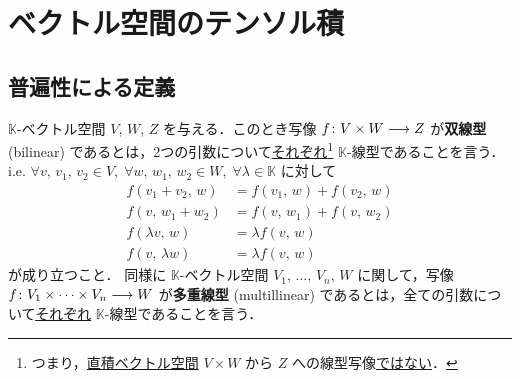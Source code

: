 \documentclass[rep_main]{subfiles}
\begin{document}
\section{ベクトル空間のテンソル積}


\subsection{普遍性による定義}

$\mathbb{K}$-ベクトル空間 $V,\, W,\, Z$ を与える．このとき写像 $f \colon V \times W \longrightarrow Z$ が\textbf{双線型} (bilinear) であるとは，2つの引数について\underline{それぞれ}\footnote{つまり，\hyperref[def:univ-vec-sum]{直積ベクトル空間} $V \times W$ から $Z$ への線型写像\underline{ではない}．} $\mathbb{K}$-線型であることを言う．i.e. $\forall v,\, v_1,\, v_2 \in V,\; \forall w,\, w_1,\, w_2 \in W,\; \forall \lambda \in \mathbb{K}$ に対して
\begin{align}
    f(v_1 + v_2,\, w) &= f(v_1,\, w) + f(v_2,\, w) \\
    f(v,\, w_1 + w_2) &= f(v,\, w_1) + f(v,\, w_2) \\
    f(\lambda v,\, w) &= \lambda f(v,\, w) \\
    f(v,\, \lambda w) &= \lambda f(v,\, w)
\end{align}
が成り立つこと．
同様に $\mathbb{K}$-ベクトル空間 $V_1,\, \dots,\, V_n,\, W$ に関して，写像 $f \colon V_1 \times \cdots \times V_n \longrightarrow W$ が\textbf{多重線型} (multillinear) であるとは，全ての引数について\underline{それぞれ} $\mathbb{K}$-線型であることを言う．
\end{document}

